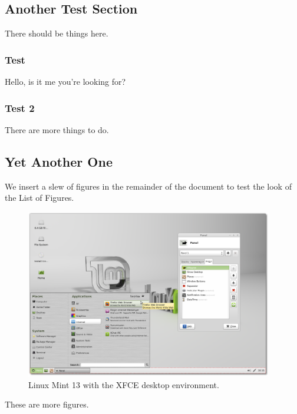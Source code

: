 \subsection{Another Test Section}
There should be things here.


\subsubsection{Test}
Hello, is it me you're looking for?

\subsubsection{Test 2}
There are more things to do.

\subsection{Yet Another One}
We insert a slew of figures in the remainder of the document to test the look of the List of Figures.

\begin{figure}[H]
	\centering
	\includegraphics[width=4.25in]{images/Mint_XFCE.png}
	\caption{Linux Mint 13 with the XFCE desktop environment.}
\end{figure}

These are more figures.

